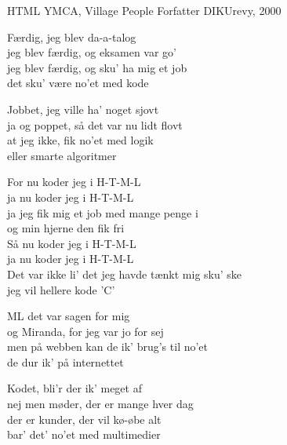 \begin{song}{HTML}
  {} %
  {YMCA, Village People} %
  {Forfatter} %
  {DIKUrevy, 2000} %
  {\NotCCLIed} %

  \begin{SBVerse}
    Færdig, jeg blev da-a-talog\\
    jeg blev færdig, og eksamen var go'\\
    jeg blev færdig, og sku' ha mig et job\\
    det sku' være no'et med kode
  \end{SBVerse}

  \begin{SBVerse}
    Jobbet, jeg ville ha' noget sjovt\\
    ja og poppet, så det var nu lidt flovt\\
    at jeg ikke, fik no'et med logik\\
    eller smarte algoritmer
  \end{SBVerse}

  \begin{SBChorus}
    For nu koder jeg i H-T-M-L\\
    ja nu koder jeg i H-T-M-L\\
    ja jeg fik mig et job med mange penge i\\
    og min hjerne den fik fri\\\medskip
    Så nu koder jeg i H-T-M-L\\
    ja nu koder jeg i H-T-M-L\\
    Det var ikke li' det jeg havde tænkt mig sku' ske\\
    jeg vil hellere kode 'C'
  \end{SBChorus}

  \begin{SBVerse}
    ML det var sagen for mig\\
    og Miranda, for jeg var jo for sej\\
    men på webben kan de ik' brug's til no'et\\
    de dur ik' på internettet
  \end{SBVerse}

  \begin{SBVerse}
    Kodet, bli'r der ik' meget af\\
    nej men møder, der er mange hver dag\\
    der er kunder, der vil kø-øbe alt\\
    bar' det' no'et med multimedier
  \end{SBVerse}


\end{song}
